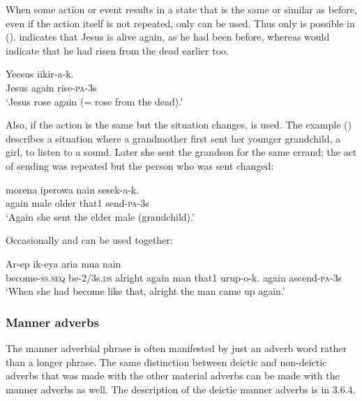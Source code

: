When some action or event results in a state that is the same or similar as before, even if the action itself is not repeated, only\textstyleStyleVernacularWordsItalic{}  can be used. Thus only  is possible in ().  indicates that Jesus is alive again, as he had been before, whereas  would indicate that he had risen from the dead earlier too.

\ea%
\label{ex:x503}
\gll Yeesus  iikir-a-k. \\
Jesus again rise-\textsc{pa}-3s\\
\glt`Jesus rose again (= rose from the dead).'
\z

Also, if the action is the same but the situation changes,  is used. The example () describes a situation where a grandmother first sent her younger grandchild, a girl, to listen to a sound. Later she sent the grandson for the same errand; the act of sending was repeated but the person who was sent changed:

\ea%
\label{ex:x1761}
\gll {} morena iperowa nain sesek-a-k. \\
again male older that1 send-\textsc{pa}-3s\\
\glt`Again she sent the elder male (grandchild).'
\z

Occasionally  and  can be used together:

\ea%
\label{ex:x700}
\gll Ar-ep ik-eya aria  mua nain \\
become-\textsc{ss}.\textsc{seq} be-2/3s.\textsc{ds} alright again man that1
 urup-o-k.
again ascend-\textsc{pa}-3s\\
\glt`When she had become like that, alright the man came up again.'
\z

\subsubsection[Manner adverbs]{Manner adverbs}
{}
The manner adverbial phrase is often manifested by just an adverb word rather than a longer phrase. The same distinction between deictic and non-deictic adverbs that was made with the other material adverbs can be made with the manner adverbs as well. The description of the deictic manner adverbs is in 3.6.4.

